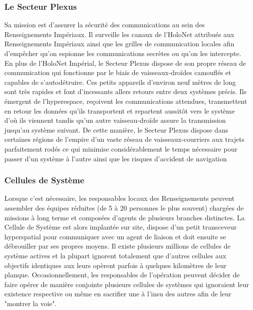 \documentclass[twoside]{article}
\begin{document}
\subsubsection{Le Secteur Plexus}
Sa mission est d'assurer la sécurité des communications au sein des Renseignements Impériaux. Il surveille les canaux de l'HoloNet attribués aux Renseignements Impériaux ainsi que les grilles de communication locales afin d'empêcher qu'on espionne les communications secrètes ou qu'on les intercepte. En plus de l'HoloNet Impérial, le Secteur Plexus dispose de son propre réseau de communication qui fonctionne par le biais de vaisseaux-droïdes camouflés et capables de s'autodétruire. Ces petits appareils d'environ neuf mètres de long sont très rapides et font d'incessants allers retours entre deux systèmes précis. Ils émergent de l'hyperespace, reçoivent les communications attendues, transmettent en retour les données qu'ils transportent et repartent aussitôt vers le système d'où ils viennent tandis qu'un autre vaisseau-droïde assure la transmission jusqu'au système suivant. De cette manière, le Secteur Plexus dispose dans certaines régions de l'empire d'un vaste réseau de vaisseaux-courriers aux trajets parfaitement rodés ce qui minimise considérablement le temps nécessaire pour passer d'un système à l'autre ainsi que les risques d'accident de navigation

\subsubsection{Cellules de Système}
Lorsque c'est nécessaire, les responsables locaux des Renseignements peuvent assembler des équipes réduites (de 5 à 20 personnes le plus souvent) chargées de missions à long terme et composées d'agents de plusieurs branches distinctes. La Cellule de Système est alors implantée sur site, dispose d'un petit transceveur hyperspatial pour communiquer avec un agent de liaison et doit ensuite se débrouiller par ses propres moyens. Il existe plusieurs millions de cellules de système actives et la plupart ignorent totalement que d'autres cellules aux objectifs identiques aux leurs opèrent parfois à quelques kilomètres de leur planque. Occasionnellement, les responsables de l'opération peuvent décider de faire opérer de manière conjointe plusieurs cellules de systèmes qui ignoraient leur existence respective ou même en sacrifier une à l'insu des autres afin de leur "montrer la voie".
\end{document}
